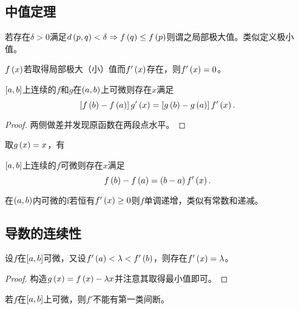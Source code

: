 \documentclass{ctexrep}
\begin{document}
  \subsection{中值定理}
  \begin{definition}
    若存在$\delta>0$满足$d\left(p,q\right)<\delta\Rightarrow f\left(q\right)\le f\left(p\right)$则谓之局部极大值。类似定义极小值。
  \end{definition}
  \begin{theorem}
    $f\left(x\right)$若取得局部极大（小）值而$f'\left(x\right)$存在，则$f'\left(x\right)=0$。
  \end{theorem}
  \begin{theorem}
    $\left[a,b\right]$上连续的$f$和$g$在$\left(a,b\right)$上可微则存在$x$满足
    \[ \left[f\left(b\right)-f\left(a\right)\right] g'\left(x\right) = \left[g\left(b\right)-g\left(a\right)\right]f'\left(x\right). \]
  \end{theorem}
  \begin{proof}
    两侧做差并发现原函数在两段点水平。
  \end{proof}
  取$g\left(x\right)=x$，有
  \begin{theorem}
    $\left[a,b\right]$上连续的$f$可微则存在$x$满足
    \[ {f\left(b\right)-f\left(a\right)} = \left(b-a\right)f'\left(x\right). \]
  \end{theorem}
  \begin{theorem}
    在$\left(a,b\right)$内可微的f若恒有$f'\left(x\right)\ge 0$则$f$单调递增，类似有常数和递减。
  \end{theorem}
  \subsection{导数的连续性}
  \begin{theorem}
    设$f$在$\left[a,b\right]$可微，又设$f'\left(a\right)<\lambda<f'\left(b\right)$，则存在$f'\left(x\right)=\lambda$。
  \end{theorem}
  \begin{proof}
    构造$g\left(x\right)=f\left(x\right)-\lambda x$并注意其取得最小值即可。
  \end{proof}
  \begin{corollary}
    若$f$在$\left[a,b\right]$上可微，则$f'$不能有第一类间断。
  \end{corollary}
\end{document}
